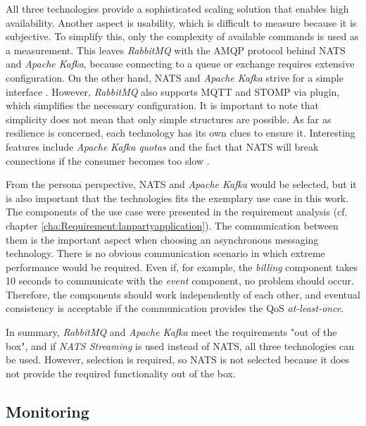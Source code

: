 All three technologies provide a sophisticated scaling solution that enables high availability.
Another aspect is usability, which is difficult to measure because it is subjective.
To simplify this, only the complexity of available commands is used as a measurement.
This leaves \textit{RabbitMQ} with the \ac{AMQP} protocol behind \ac{NATS} and \textit{Apache Kafka}, because connecting to a queue or exchange requires extensive configuration.
On the other hand, \ac{NATS} and \textit{Apache Kafka} strive for a simple interface \cite[p.~8]{Quevedo.2018} \cite[p.~18]{Stopford.2018}.
However, \textit{RabbitMQ} also supports \ac{MQTT} and \ac{STOMP} via plugin, which simplifies the necessary configuration.
It is important to note that simplicity does not mean that only simple structures are possible.
As far as resilience is concerned, each technology has its own clues to ensure it.
Interesting features include \textit{Apache Kafka} \textit{quotas} \cite[p.~21]{Stopford.2018} and the fact that \ac{NATS} will break connections if the consumer becomes too slow \cite[p.~9]{Quevedo.2018}.

From the persona perspective, \ac{NATS} and \textit{Apache Kafka} would be selected, but it is also important that the technologies fits the exemplary use case in this work.
The components of the use case were presented in the requirement analysis (cf. chapter \ref{cha:Requirement:lanpartyapplication}).
The communication between them is the important aspect when choosing an asynchronous messaging technology.
There is no obvious communication scenario in which extreme performance would be required.
Even if, for example, the \textit{billing} component takes 10 seconds to communicate with the \textit{event} component, no problem should occur.
Therefore, the components should work independently of each other, and eventual consistency is acceptable if the communication provides the \ac{QoS} \textit{at-least-once}.

In summary, \textit{RabbitMQ} and \textit{Apache Kafka} meet the requirements "out of the box", and if \textit{NATS Streaming} is used instead of \ac{NATS}, all three technologies can be used.
However, selection is required, so \ac{NATS} is not selected because it does not provide the required functionality out of the box.

\subsection{Monitoring}\label{cha:Technologies:selection:monitoring}

